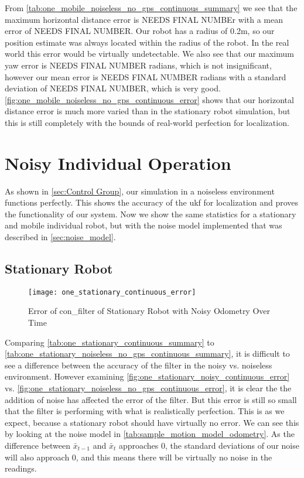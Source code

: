 \documentclass[thesis.tex]{subfile}
\begin{document}
From \autoref{tab:one_mobile_noiseless_no_gps_continuous_summary} we see that the maximum horizontal distance error is NEEDS FINAL NUMBEr with a mean error of NEEDS FINAL NUMBER. Our robot has a radius of 0.2m, so our position estimate was always located within the radius of the robot. In the real world this error would be virtually undetectable. We also see that our maximum yaw error is NEEDS FINAL NUMBER radians, which is not insignificant, however our mean error is NEEDS FINAL NUMBER radians with a standard deviation of NEEDS FINAL NUMBER, which is very good. \autoref{fig:one_mobile_noiseless_no_gps_continuous_error} shows that our horizontal distance error is much more varied than in the stationary robot simulation, but this is still completely with the bounds of real-world perfection for localization.

\section{Noisy Individual Operation}
As shown in \autoref{sec:Control Group}, our simulation in a noiseless environment functions perfectly. This shows the accuracy of the \gls{ukf} for localization and proves the functionality of our system. Now we show the same statistics for a stationary and mobile individual robot, but with the noise model implemented that was described in \autoref{sec:noise_model}.

\subsection{Stationary Robot}


\begin{figure}
\centering
\texttt{[image: one\_stationary\_continuous\_error]}
\caption{Error of \gls{con_filter} of Stationary Robot with Noisy Odometry Over Time}
\label{fig:one_stationary_noisy_continuous_error}
\end{figure}

Comparing \autoref{tab:one_stationary_continuous_summary} to \autoref{tab:one_stationary_noiseless_no_gps_continuous_summary}, it is difficult to see a difference between the accuracy of the filter in the noisy vs. noiseless environment. However examining \autoref{fig:one_stationary_noisy_continuous_error} vs. \autoref{fig:one_stationary_noiseless_no_gps_continuous_error}, it is clear the the addition of noise has affected the error of the filter. But this error is still so small that the filter is performing with what is realistically perfection. This is as we expect, because a stationary robot should have virtually no error. We can see this by looking at the noise model in \autoref{tab:sample_motion_model_odometry}. As the difference between $\bar{x}_{t-1}$ and $\bar{x}_t$ approaches 0, the standard deviations of our noise will also approach 0, and this means there will be virtually no noise in the readings.
\end{document}
